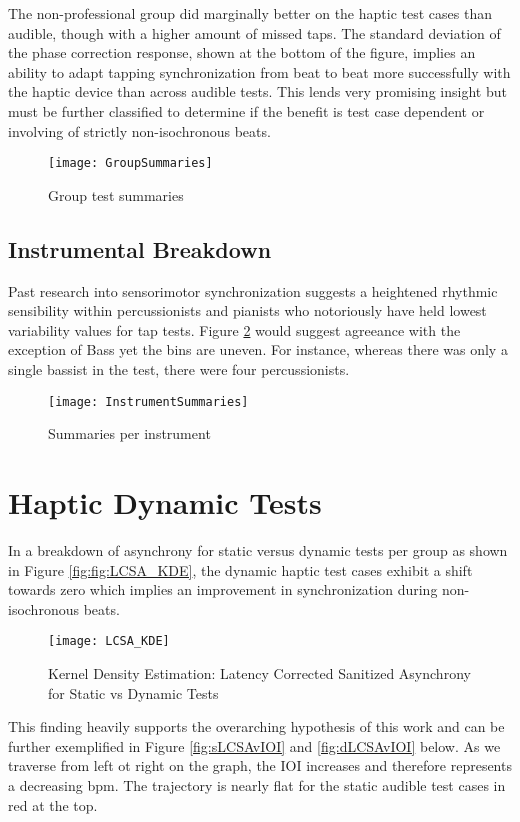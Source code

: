 The non-professional group did marginally better on the haptic test cases than audible, though with a higher amount of missed taps. The standard deviation of the phase correction response, shown at the bottom of the figure, implies an ability to adapt tapping synchronization from beat to beat more successfully with the haptic device than across audible tests. This lends very promising insight but must be further classified to determine if the benefit is test case dependent or involving of strictly non-isochronous beats.
\begin{figure}[H]
    \centering
    \texttt{[image: GroupSummaries]}
    \caption{Group test summaries}
    \label{fig:GroupSummaries}
\end{figure}
\subsection{Instrumental Breakdown}

Past research into sensorimotor synchronization suggests a heightened rhythmic sensibility within percussionists and pianists who notoriously have held lowest variability values for tap tests. Figure \ref{fig:InstrumentSummaries} would suggest agreeance with the exception of Bass yet the bins are uneven. For instance, whereas there was only a single bassist in the test, there were four percussionists.

\begin{figure}[H]
    \centering
    \texttt{[image: InstrumentSummaries]}
    \caption{Summaries per instrument}
    \label{fig:InstrumentSummaries}
\end{figure}

\section{Haptic Dynamic Tests}
In a breakdown of asynchrony for static versus dynamic tests per group as shown in Figure \ref{fig:fig:LCSA_KDE}, the dynamic haptic test cases exhibit a shift towards zero which implies an improvement in synchronization during non-isochronous beats. 
\begin{figure}[H]
    \centering
    \texttt{[image: LCSA\_KDE]}
    \caption{Kernel Density Estimation: Latency Corrected Sanitized Asynchrony for Static vs Dynamic Tests}
    \label{fig:LCSA_KDE}
\end{figure}

This finding heavily supports the overarching hypothesis of this work and can be further exemplified in Figure \ref{fig:sLCSAvIOI} and \ref{fig:dLCSAvIOI} below. As we traverse from left ot right on the graph, the IOI increases and therefore represents a decreasing bpm. The trajectory is nearly flat for the static audible test cases in red at the top. 

